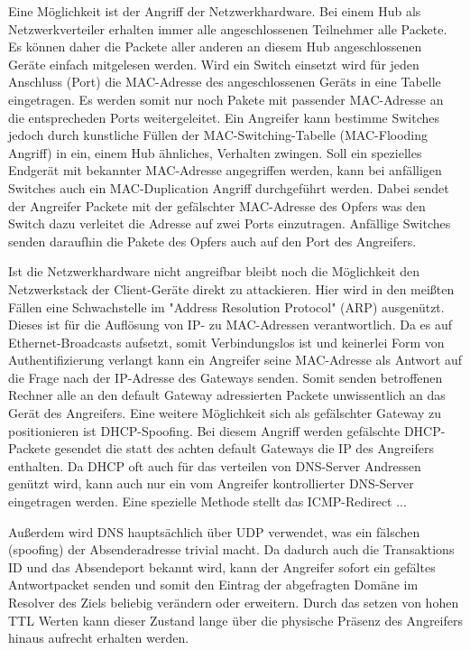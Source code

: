 Eine Möglichkeit ist der Angriff der Netzwerkhardware. Bei einem Hub als Netzwerkverteiler erhalten immer alle angeschlossenen Teilnehmer alle Packete. Es können daher die Packete aller anderen an diesem Hub angeschlossenen Geräte einfach mitgelesen werden. Wird ein Switch einsetzt wird für jeden Anschluss (Port) die MAC-Adresse des angeschlossenen Geräts in eine Tabelle eingetragen. Es werden somit nur noch Pakete mit passender MAC-Adresse an die entsprecheden Ports weitergeleitet. Ein Angreifer kann bestimme Switches jedoch durch kunstliche Füllen der MAC-Switching-Tabelle (MAC-Flooding Angriff) in ein, einem Hub ähnliches, Verhalten zwingen. Soll ein spezielles Endgerät mit bekannter MAC-Adresse angegriffen werden, kann bei anfälligen Switches auch ein MAC-Duplication Angriff durchgeführt werden. Dabei sendet der Angreifer Packete mit der gefälschter MAC-Adresse des Opfers was den Switch dazu verleitet die Adresse auf zwei Ports einzutragen. Anfällige Switches senden daraufhin die Pakete des Opfers auch auf den Port des Angreifers.

Ist die Netzwerkhardware nicht angreifbar bleibt noch die Möglichkeit den Netzwerkstack der Client-Geräte direkt zu attackieren. Hier wird in den meißten Fällen eine Schwachstelle im "Address Resolution Protocol" (ARP) ausgenützt. Dieses ist für die Auflösung von IP- zu MAC-Adressen verantwortlich. Da es auf Ethernet-Broadcasts aufsetzt, somit Verbindungslos ist und keinerlei Form von Authentifizierung verlangt kann ein Angreifer seine MAC-Adresse als Antwort auf die Frage nach der IP-Adresse des Gateways senden. Somit senden betroffenen Rechner alle an den default Gateway adressierten Packete unwissentlich an das Gerät des Angreifers. Eine weitere Möglichkeit sich als gefälschter Gateway zu positionieren ist DHCP-Spoofing. Bei diesem Angriff werden gefälschte DHCP-Packete gesendet die statt des achten default Gateways die IP des Angreifers enthalten. Da DHCP oft auch für das verteilen von DNS-Server Andressen genützt wird, kann auch nur ein vom Angreifer kontrollierter DNS-Server eingetragen werden. Eine spezielle Methode stellt das ICMP-Redirect ...

Außerdem wird DNS hauptsächlich über UDP verwendet, was ein fälschen (spoofing) der Absenderadresse trivial macht. Da dadurch auch die Transaktions ID und das Absendeport bekannt wird, kann der Angreifer sofort ein gefältes Antwortpacket senden und somit den Eintrag der abgefragten Domäne im Resolver des Ziels beliebig verändern oder erweitern. Durch das setzen von hohen TTL Werten kann dieser Zustand lange über die physische Präsenz des Angreifers hinaus aufrecht erhalten werden.



